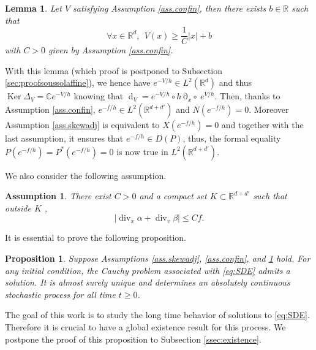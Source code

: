 \documentclass[12pt]{amsart}
\newcommand{\C}{\mathbb C}
\newcommand{\R}{\mathbb R}
\newcommand{\Ker}{\operatorname{Ker}}
\renewcommand{\div}{\operatorname{div}}
\renewcommand{\d}{\operatorname{d}}
\numberwithin{equation}{section}
\numberwithin{figure}{section}
\DeclareMathOperator{\p}{\partial}
\newtheorem{lemma}[defin]{Lemma}
\newtheorem{proposition}[defin]{Proposition}
\newtheorem{assumption}{Assumption}
\begin{document}
\begin{lemma}\label{lem:soussolaffine}
    Let $V$ satisfying Assumption \ref{ass.confin}, then there exists $b\in\R$ such that
    \begin{equation*}
    \forall x\in\R^d,\ \ V(x) \geq \frac1C|x| + b
    \end{equation*}
    with $C>0$ given by Assumption \ref{ass.confin}. 
\end{lemma}
With this lemma (which proof is postponed to Subsection \ref{sec:proofsoussolaffine}), we hence have $e^{-V/h}\in L^2(\R^d)$ and thus $\Ker\Delta_V = \C e^{-V/h}$ knowing that $\d_V = e^{-V/h}\circ h\p_x\circ\ e^{V/h}$. Then, thanks to Assumption \ref{ass.confin}, $e^{-f/h}\in L^2(\R^{d+d'})$ and $N(e^{-f/h}) = 0$. Moreover Assumption \ref{ass.skewadj} is equivalent to $X(e^{-f/h}) = 0$ and together with the last assumption, it ensures that $e^{-f/h}\in D(P)$, thus, the formal equality $P(e^{-f/h}) = P^*(e^{-f/h}) = 0$ is now true in $L^2(\R^{d+d'})$.

We also consider the following assumption.
\begin{assumption}\label{ass.accretive}
    There exist $C>0$ and a compact set $K\subset\R^{d+d'}$ such that outside $K$%
,
    \begin{equation*}
    |\div_x \alpha + \div_v\beta|\leq Cf.
    \end{equation*}
\end{assumption}
It is essential to prove the following proposition.
\begin{proposition}\label{prop:existence}
    Suppose %
Assumptions \ref{ass.skewadj}, \ref{ass.confin}, and \ref{ass.accretive} hold. For any initial condition, the Cauchy problem associated with \eqref{eq:SDE} admits %
a solution. It is almost surely unique and determines an absolutely continuous stochastic process for all time $t\geq0$.
\end{proposition}
The %
goal of this work is to study the long time behavior of solutions to \eqref{eq:SDE}. Therefore it is crucial to have a global existence result for this process. We postpone the proof of this proposition to Subsection \ref{ssec:existence}.
\end{document}
